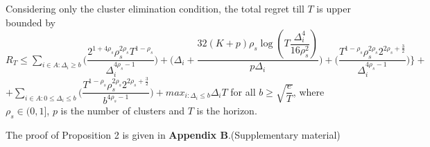 
	
	
	

\begin{proposition}
Considering only the cluster elimination condition, the total regret till $T$ is upper bounded by $R_{T}\leq \sum_{i\in A:\Delta_{i}\geq b}\bigg(\dfrac{2^{1+4\rho_{s}}\rho_{s}^{2\rho_{s}}T^{1-\rho_{s}}}{\Delta_{i}^{4\rho_{s}-1}}\bigg) + \bigg(\Delta_{i}+\dfrac{32(K+p)\rho_{s}\log{(T\dfrac{\Delta_{i}^{4}}{16\rho_{s}^{2}})}}{p\Delta_{i}}\bigg)  +  \bigg(\dfrac{T^{1-\rho_{s}}\rho_{s}^{2\rho_{s}}2^{2\rho_{s}+\frac{3}{2}}}{\Delta_{i}^{4\rho_{s} -1}} \bigg) \bigg \rbrace+$\newline$+\sum_{i\in A:0\leq\Delta_{i}\leq b}\bigg(\dfrac{T^{1-\rho_{s}}\rho_{s}^{2\rho_{s}}2^{2\rho_{s}+\frac{3}{2}}}{b^{4\rho_{s} -1}} \bigg) + max_{i:\Delta_{i}\leq b}\Delta_{i}T$ for all $b\geq \sqrt{\dfrac{e}{T}}$, where $\rho_{s}\in (0,1]$, $p$ is the number of clusters and $T$ is the horizon.
\end{proposition}

	The proof of Proposition 2 is given in \textbf{Appendix B}.(Supplementary material)


